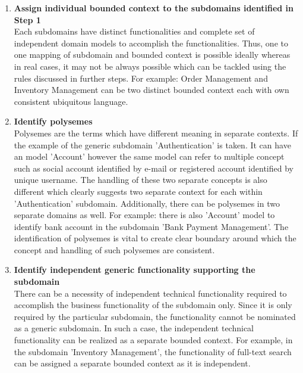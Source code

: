 \begin{enumerate}
\item \textbf{Assign individual bounded context to the subdomains identified in Step 1}
\\
Each subdomains have distinct functionalities and complete set of independent domain models to accomplish the functionalities. Thus, one to one mapping of subdomain and bounded context is possible ideally whereas in real cases, it may not be always possible which can be tackled using the rules discussed in further steps. For example: Order Management and Inventory Management can be two distinct bounded context each with own consistent ubiquitous language. \cite{Fowler:2014ab}\cite{Gorodinski:2013aa}
\\
\item \textbf{Identify polysemes}
\\
Polysemes are the terms which have different meaning in separate contexts. If the example of the generic subdomain 'Authentication' is taken. It can have an model 'Account' however the same model can refer to multiple concept such as social account identified by e-mail or registered account identified by unique username. The handling of these two separate concepts is also different which clearly suggests two separate context for each within 'Authentication' subdomain. Additionally, there can be polysemes in two separate domains as well. For example: there is also 'Account' model to identify bank account in the subdomain 'Bank Payment Management'. The identification of polysemes is vital to create clear boundary around which the concept and handling of such polysemes are consistent. \cite{Fowler:2014ab}
\\
\item \textbf{Identify independent generic functionality supporting the subdomain}
\\
There can be a necessity of independent technical functionality required to accomplish the business functionality of the subdomain only. Since it is only required by the particular subdomain, the functionality cannot be nominated as a generic subdomain. In such a case, the independent technical functionality can be realized as a separate bounded context. For example, in the subdomain 'Inventory Management', the functionality of full-text search can be assigned a separate bounded context as it is independent.\cite{Gorodinski:2013aa}
\end{enumerate}
\\
